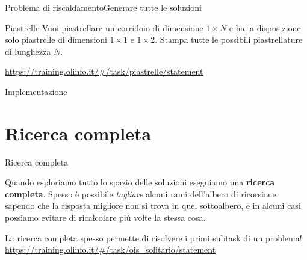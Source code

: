 \documentclass{beamer}
\begin{document}
\begin{frame}{Problema di riscaldamento}{Generare tutte le soluzioni}
    \begin{exampleblock}{Piastrelle}
        Vuoi piastrellare un corridoio di dimensione $1 \times N$ e hai a disposizione solo piastrelle di 
        dimensioni $1 \times 1$ e $1 \times 2$. Stampa tutte le possibili piastrellature di lunghezza $N$.
    \end{exampleblock}
    \pause
    \vfill
    \vfill
    \small{\underline{\url{https://training.olinfo.it/\#/task/piastrelle/statement}}}
\end{frame}

\begin{frame}{Implementazione}{}
\end{frame}

\section{Ricerca completa}

\begin{frame}{Ricerca completa}
    \begin{block}{}
        Quando esploriamo tutto lo spazio delle soluzioni eseguiamo una \textbf{ricerca completa}.
        \pause
        \bigbreak
        Spesso \`e possibile \emph{tagliare} alcuni rami dell'albero di ricorsione sapendo che la risposta migliore 
        non si trova in quel sottoalbero, e in alcuni casi possiamo evitare di ricalcolare pi\`u volte la stessa cosa. \\
    \end{block}
    La ricerca completa spesso permette di risolvere i primi subtask di un problema!
    \vfill
    \small{\underline{\url{https://training.olinfo.it/\#/task/ois_solitario/statement}}}
\end{frame}
\end{document}
